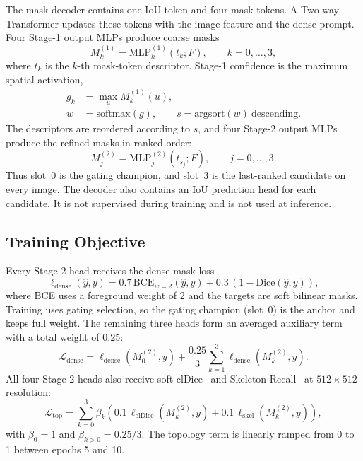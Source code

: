 The mask decoder contains one IoU token and four mask tokens. A Two-way
Transformer updates these tokens with the image feature and the dense prompt.
Four Stage-1 output MLPs produce coarse masks
\begin{equation}
M_k^{(1)}=\mathrm{MLP}_k^{(1)}(t_k;F),
\qquad k=0,\dots,3,
\end{equation}
where $t_k$ is the $k$-th mask-token descriptor. Stage-1 confidence is the
maximum spatial activation,
\begin{equation}
\begin{aligned}
g_k&=\max_{u}M_k^{(1)}(u),\\
w&=\mathrm{softmax}(g),\qquad
s=\mathrm{argsort}(w)~\text{descending}.
\end{aligned}
\end{equation}
The descriptors are reordered according to $s$, and four Stage-2 output MLPs
produce the refined masks in ranked order:
\begin{equation}
M_j^{(2)}=\mathrm{MLP}_j^{(2)}\!\left(t_{s_j};F\right),
\qquad j=0,\dots,3.
\end{equation}
Thus slot~0 is the gating champion, and slot~3 is the last-ranked candidate
on every image. The decoder also contains an IoU prediction head for each
candidate. It is not supervised during training and is not used at inference.

\subsection{Training Objective}
\label{sec:supp_losses}

Every Stage-2 head receives the dense mask loss
\begin{equation}
\ell_{\mathrm{dense}}(\hat y,y)
=0.7\,\mathrm{BCE}_{w=2}(\hat y,y)+0.3\,(1-\mathrm{Dice}(\hat y,y)),
\label{eq:supp_dense}
\end{equation}
where BCE uses a foreground weight of 2 and the targets are soft bilinear
masks. Training uses gating selection, so the gating champion (slot~0) is the
anchor and keeps full weight. The remaining three heads form an averaged
auxiliary term with a total weight of $0.25$:
\begin{equation}
\mathcal{L}_{\mathrm{dense}}
=\ell_{\mathrm{dense}}(M_0^{(2)},y)
+\frac{0.25}{3}\sum_{k=1}^{3}\ell_{\mathrm{dense}}(M_k^{(2)},y).
\label{eq:supp_dense_total}
\end{equation}
All four Stage-2 heads also receive soft-clDice~\cite{shit2021cldice} and
Skeleton Recall~\cite{kirchhoff2024skeletonrecall} at $512\times512$
resolution:
\begin{equation}
\mathcal{L}_{\mathrm{top}}
=\sum_{k=0}^{3}\beta_k
\left(0.1\,\ell_{\mathrm{clDice}}(M_k^{(2)},y)
+0.1\,\ell_{\mathrm{skel}}(M_k^{(2)},y)\right),
\label{eq:supp_top}
\end{equation}
with $\beta_0=1$ and $\beta_{k>0}=0.25/3$. The topology term is linearly
ramped from 0 to 1 between epochs 5 and 10.

